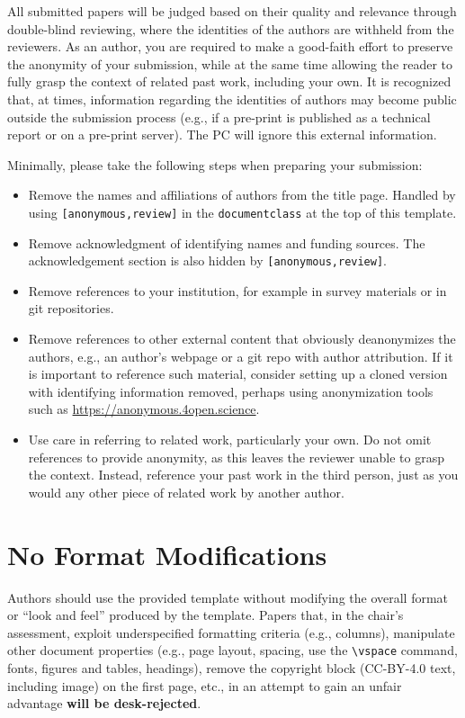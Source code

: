 \documentclass[sigconf,anonymous,review]{acmart}
\begin{document}
All submitted papers will be judged based on their quality and relevance through
double-blind reviewing, where the identities of the authors are withheld from
the reviewers. As an author, you are required to make a good-faith effort to
preserve the anonymity of your submission, while at the same time allowing the
reader to fully grasp the context of related past work, including your own. It
is recognized that, at times, information regarding the identities of authors
may become public outside the submission process (e.g., if a pre-print is
published as a technical report or on a pre-print server). The PC will ignore
this external information.

Minimally, please take the following steps when preparing your submission:

\begin{itemize}
  \item Remove the names and affiliations of authors from the title page.
  Handled by using \verb|[anonymous,review]| in the \verb|documentclass| at the
  top of this template.
  \item Remove acknowledgment of identifying names and funding sources. The
  acknowledgement section is also hidden by \verb|[anonymous,review]|.
  \item Remove references to your institution, for example in survey materials
  or in git repositories.
  \item Remove references to other external content that obviously deanonymizes
  the authors, e.g., an author's webpage or a git repo with author attribution.
  If it is important to reference such material, consider setting up a cloned
  version with identifying information removed, perhaps using anonymization
  tools such as \url{https://anonymous.4open.science}.
  \item Use care in referring to related work, particularly your own. Do not
  omit references to provide anonymity, as this leaves the reviewer unable to
  grasp the context. Instead, reference your past work in the third person, just
  as you would any other piece of related work by another author.
\end{itemize}

\section{No Format Modifications}

Authors should use the provided template without modifying the overall format or
``look and feel'' produced by the template. Papers that, in the chair's
assessment, exploit underspecified formatting criteria (e.g., columns),
manipulate other document properties (e.g., page layout, spacing, use the
\verb|\vspace| command, fonts, figures and tables, headings), remove the
copyright block (CC-BY-4.0 text, including image) on the first page, etc., in an
attempt to gain an unfair advantage \textbf{will be desk-rejected}.
\end{document}
